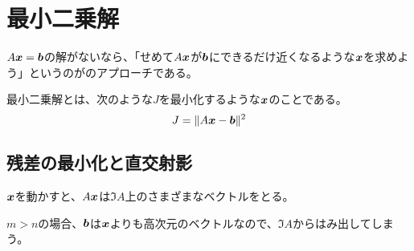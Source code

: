 \documentclass[../../../topic_linear-algebra]{subfiles}
\begin{document}
\sectionline
\section{最小二乗解}

$A\vb*{x} = \vb*{b}$の解がないなら、「せめて$A\vb*{x}$が$\vb*{b}$にできるだけ近くなるような$\vb*{x}$を求めよう」というのがのアプローチである。

\br

最小二乗解とは、次のような$J$を最小化するような$\vb*{x}$のことである。
\begin{equation*}
  J = \| A\vb*{x} - \vb*{b} \|^2
\end{equation*}

\subsection{残差の最小化と直交射影}

$\vb*{x}$を動かすと、$A\vb*{x}$は$\Im A$上のさまざまなベクトルをとる。

$m > n$の場合、$\vb*{b}$は$\vb*{x}$よりも高次元のベクトルなので、$\Im A$からはみ出してしまう。
\end{document}
